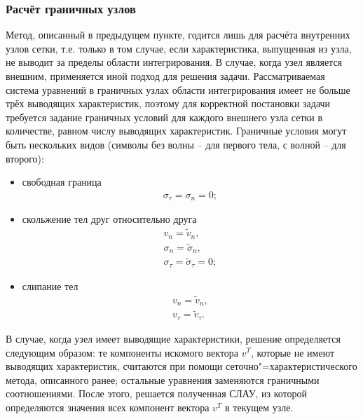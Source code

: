 \subsubsection{Расчёт граничных узлов}
Метод, описанный в предыдущем пункте, годится лишь для расчёта внутренних узлов
сетки, т.е. только в том случае, если характеристика, выпущенная из узла, не
выводит за пределы области интегрирования. В случае, когда узел является
внешним, применяется иной подход для решения задачи. Рассматриваемая система
уравнений в граничных узлах области интегрирования имеет не больше трёх
\cite{chelnokov} выводящих характеристик, поэтому для корректной постановки
задачи требуется задание граничных условий для каждого внешнего узла сетки в
количестве, равном числу выводящих характеристик. Граничные условия могут быть
нескольких видов (символы без волны -- для первого тела, с волной -- для второго):
\begin{itemize}
\item{свободная граница
\begin{eqnarray}
\sigma_\tau=\sigma_n=0; \nonumber
\end{eqnarray}}
\item{скольжение тел друг относительно друга 
\begin{eqnarray}
v_n=\tilde{v}_n,\nonumber\\
\sigma_n=\tilde{\sigma}_n,\nonumber\\
\sigma_\tau=\tilde{\sigma}_\tau=0; \nonumber
\end{eqnarray}}
\item{слипание тел
\begin{eqnarray}
v_n=\tilde{v}_n,\nonumber\\
v_\tau=\tilde{v}_\tau.
\end{eqnarray}}
\end{itemize}
В случае, когда узел имеет выводящие характеристики, решение определяется
следующим образом: те компоненты искомого вектора $v^T$, которые не имеют
выводящих характеристик, считаются при помощи сеточно"=характеристического
метода, описанного ранее; остальные уравнения заменяются граничными
соотношениями. После этого, решается полученная СЛАУ, из которой определяются
значения всех компонент вектора $v^T$ в текущем узле.
